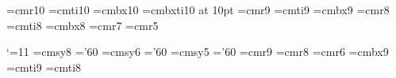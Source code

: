 \ctln{\centerline}
\nidt{\noindent}
\ubr{\underbar}
\ssk{\smallskip}
\msk{\medskip}
\bsk{\bigskip}

\smin{$\setminus$}
\mtset{$\emptyset$} \mtsetsp{$\emptyset$ }
\ap{$\cap$}
\bup{$\bigcup$}
\up{$\cup$}
\bap{$\bigcap$}
\ra{$\rightarrow$}


\eltof{$\in$}
\noin{$\notin$}
\sset{$\subseteq$} \ssetsp{$\subseteq$ }

\del{$\partial$}
 
 
\lset{$\{$}
\rset{$\}$}
\lsetsp{$\{$ }
\rsetsp{$\}$ }



\font\tenrm=cmr10
\font\tenit=cmti10 
\font\tenbf=cmbx10
\font\bfit=cmbxti10 at 10pt
\font\ninerm=cmr9
\font\nineit=cmti9
\font\ninebf=cmbx9
\font\eightrm=cmr8
\font\eightit=cmti8
\font\eightbf=cmbx8
\font\sevenrm=cmr7
\font\fiverm=cmr5
\TagsOnRight
\parindent=15pt
\nopagenumbers

\catcode`\@=11			%
\newdimen\bigsize@		%
\def\big@#1#2{{\hbox{$\left#2\vcenter to#1\bigsize@{}%
	\right.\nulldelimiterspace\z@\m@th$}}}
\def\big{\big@\@ne} \def\Big{\big@{1.5}} \def\bigg{\big@\tw@}
\def\Bigg{\big@{2.5}}
	\font@\eightsy=cmsy8	\skewchar\eightsy='60 
	\font@\sixsy=cmsy6	\skewchar\sixsy='60   
	\font@\fivesy=cmsy5	\skewchar\fivesy='60   
	\font@\ninerm=cmr9
	\font@\eightrm=cmr8
	\font@\sixrm=cmr6 
	\font@\ninebf=cmbx9 
	\font@\nineit=cmti9
	\font@\eightit=cmti8 
	\newtoks\eightpoint@

\def\eightpoint{\normalbaselineskip10\p@
	\abovedisplayskip10\p@ plus2.4\p@ minus7.2\p@
	\belowdisplayskip\abovedisplayskip
	\abovedisplayshortskip\z@ plus2.4\p@
	\belowdisplayshortskip5.6\p@ plus2.4\p@ minus3.2\p@
	\ifsyntax@\def\big##1{{\hbox{$\left##1\right.$}}}%
	\let\Big\big \let\bigg\big \let\Bigg\big
	\else
\textfont\z@=\eightrm\scriptfont\z@=\sixrm\scriptscriptfont\z@=\fiverm
	\textfont\tw@=\eightsy\scriptfont\tw@=\sixsy
	\scriptscriptfont\tw@=\fivesy
	\setbox\strutbox\hbox{\vrule height7\p@ depth3\p@ width\z@}%
	\setbox\strutbox@\hbox{\raise.5\normallineskiplimit\vbox{%
	\kern-\normallineskiplimit\copy\strutbox}}%
	\setbox\z@\vbox{\hbox{$($}\kern\z@}\bigsize@=1.2\ht\z@
	\fi
	\normalbaselines\eightrm\ex@.2326ex\jot3\ex@\the\eightpoint@}

